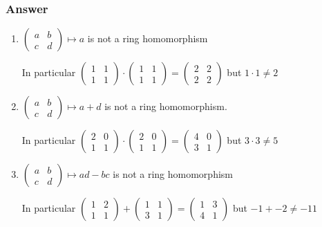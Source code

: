 \documentclass[12pt]{article}
\begin{document}
\subsubsection{Answer}
\begin{enumerate}
\item $\left( \begin{array}{lr} a&b\\c&d \end{array}\right) \mapsto a$ is not a ring homomorphism 

In particular $\left( \begin{array}{lr} 1&1\\1&1 \end{array}\right) \cdot \left( \begin{array}{lr} 1&1\\1&1 \end{array}\right) =\left( \begin{array}{lr} 2&2\\2&2 \end{array}\right) $ but $1\cdot 1 \neq 2$
\item  $\left( \begin{array}{lr} a&b\\c&d \end{array}\right) \mapsto a + d$ is not a ring homomorphism.

In particular $\left( \begin{array}{lr} 2&0\\1&1 \end{array}\right) \cdot \left( \begin{array}{lr} 2&0\\1&1 \end{array}\right) =\left( \begin{array}{lr} 4&0\\3&1 \end{array}\right) $ but $3\cdot 3 \neq 5$

\item $\left( \begin{array}{lr} a&b\\c&d \end{array}\right) \mapsto a d - bc$ is not a ring homomorphism 

In particular $\left( \begin{array}{lr} 1&2\\1&1 \end{array}\right) + \left( \begin{array}{lr} 1&1\\3&1 \end{array}\right) =\left( \begin{array}{lr} 1&3\\4&1 \end{array}\right) $ but $-1+ -2 \neq -11$
\end{enumerate}
\end{document}
